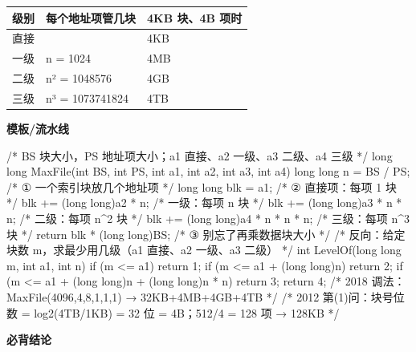 \documentclass[10pt,a4paper]{ctexart}
\begin{document}
\begin{center}\small
\begin{tabularx}{\linewidth}{@{}c>{\raggedright\arraybackslash}Xl@{}}
\toprule
级别 & 每个地址项管几块 & 4KB 块、4B 项时 \\
\midrule
直接 & 1 & 4KB \\
一级 & n = 1024 & 4MB \\
二级 & n² = 1048576 & 4GB \\
三级 & n³ = 1073741824 & 4TB \\
\bottomrule
\end{tabularx}
\end{center}

\textbf{模板/流水线}

\begin{codebox}
/* BS 块大小，PS 地址项大小；a1 直接、a2 一级、a3 二级、a4 三级 */
long long MaxFile(int BS, int PS, int a1, int a2, int a3, int a4) {
    long long n = BS / PS;                 /* ① 一个索引块放几个地址项 */
    long long blk = a1;                    /* ② 直接项：每项 1 块 */
    blk += (long long)a2 * n;              /*    一级：每项 n 块 */
    blk += (long long)a3 * n * n;          /*    二级：每项 n^2 块 */
    blk += (long long)a4 * n * n * n;      /*    三级：每项 n^3 块 */
    return blk * (long long)BS;            /* ③ 别忘了再乘数据块大小 */
}
/* 反向：给定块数 m，求最少用几级（a1 直接、a2 一级、a3 二级） */
int LevelOf(long long m, int a1, int n) {
    if (m <= a1) return 1;
    if (m <= a1 + (long long)n) return 2;
    if (m <= a1 + (long long)n + (long long)n * n) return 3;
    return 4;
}
/* 2018 调法：MaxFile(4096,4,8,1,1,1) → 32KB+4MB+4GB+4TB */
/* 2012 第(1)问：块号位数 = log2(4TB/1KB) = 32 位 = 4B；512/4 = 128 项 → 128KB */
\end{codebox}




\textbf{必背结论}
\end{document}
